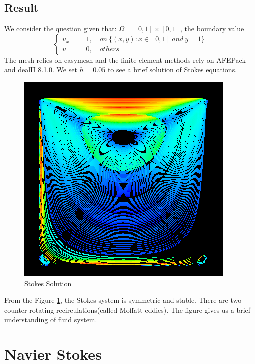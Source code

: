 \documentclass[a4paper]{article}
\begin{document}
\subsection{Result}
We consider the question given that: $\Omega = [0,1]\times[0,1]$, the boundary value
\begin{equation}
\left\lbrace
\begin{array}{rcl}
u_x &=& 1,\quad on \ \{(x,y): x \in [0,1] \ and \ y = 1\}\\
u &=& 0,\quad others
\end{array}
\right.
\label{bd::value1}
\end{equation}
The mesh relies on easymesh and the finite element methods rely on AFEPack and dealII 8.1.0. We set $h=0.05$ to see a brief solution of Stokes equations.

\begin{figure}[h]
\centering
\includegraphics[scale = 0.4]{images/Stokes.png}
\caption{Stokes Solution}
\label{im::Stokes-Solution}
\end{figure}

From the Figure \ref{im::Stokes-Solution}, the Stokes system is symmetric and stable. There are two counter-rotating recirculations(called Moffatt eddies). The figure gives us a brief understanding of fluid system.


\section{Navier Stokes}
\end{document}
